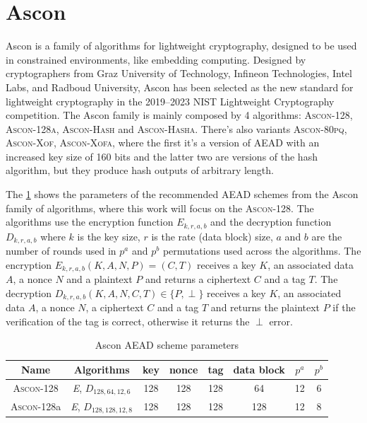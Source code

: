 \documentclass[11pt,twoside]{article}
\begin{document}
\section{Ascon}

Ascon is a family of algorithms for lightweight cryptography, designed to be used in constrained environments, like embedding computing. Designed by cryptographers from Graz University of Technology, Infineon Technologies, Intel Labs, and Radboud University, Ascon has been selected as the new standard for lightweight cryptography in the 2019–2023 NIST Lightweight Cryptography competition. The Ascon family is mainly composed by 4 algorithms: \textsc{Ascon-128}, \textsc{Ascon-128a}, \textsc{Ascon-Hash} and \textsc{Ascon-Hasha}. There's also variants \textsc{Ascon-80pq}, \textsc{Ascon-Xof}, \textsc{Ascon-Xofa}, where the first it's a version of AEAD with an increased key size of 160 bits and the latter two are versions of the hash algorithm, but they produce hash outputs of arbitrary length.

The \cref{table:aeadParameters} shows the parameters of the recommended AEAD schemes from the Ascon family of algorithms, where this work will focus on the \textsc{Ascon-128}. The algorithms use the encryption function $\textit{E}_{k,r,a,b}$ and the decryption function $\textit{D}_{k,r,a,b}$ where $k$ is the key size, $r$ is the rate (data block) size, $a$ and $b$ are the number of rounds used in $p^a$ and $p^b$ permutations used across the algorithms. The encryption $\textit{E}_{k,r,a,b}(K, A, N, P) = (C, T)$ receives a key $K$, an associated data $A$, a nonce $N$ and a plaintext $P$ and returns a ciphertext $C$ and a tag $T$. The decryption $\textit{D}_{k,r,a,b}(K, A, N, C, T) \in \{P, \perp\}$ receives a key $K$, an associated data $A$, a nonce $N$, a ciphertext $C$ and a tag $T$ and returns the plaintext $P$ if the verification of the tag is correct, otherwise it returns the $\perp$ error.

\begin{table} [h]
  \centering
  \begin{tabular}{|c|c|cccc|cc|}
    \hline
    \textbf{Name}       & \textbf{Algorithms}                     & \textbf{key} & \textbf{nonce} & \textbf{tag} & \textbf{data block} & \textbf{$p^a$} & \textbf{$p^b$} \\ \hline
    \textsc{Ascon-128}  & \textit{E}, $\textit{D}_{128,64,12,6}$  & 128          & 128            & 128          & 64                  & 12             & 6              \\ \hline
    \textsc{Ascon-128}a & \textit{E}, $\textit{D}_{128,128,12,8}$ & 128          & 128            & 128          & 128                 & 12             & 8              \\ \hline
  \end{tabular}
  \caption{Ascon AEAD scheme parameters}
  \label{table:aeadParameters}
\end{table}
\end{document}

